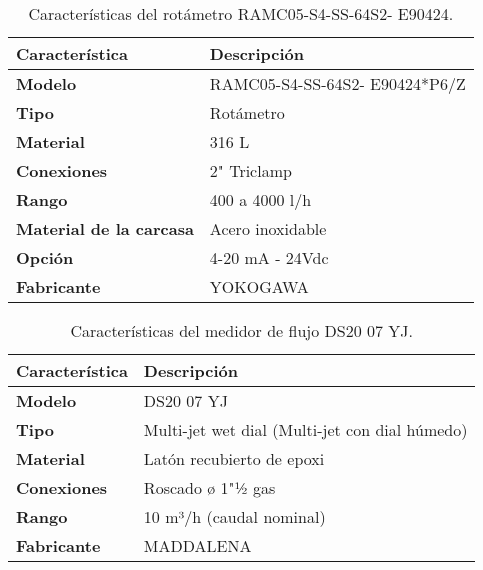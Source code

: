 \begin{table}[H]
    \centering
    \caption{Características del rotámetro RAMC05-S4-SS-64S2- E90424.}
    \label{table:sensor_transmisor_flujo}
    \begin{tabular}{| L{6cm} | L{6cm} |}
        \hline
        \textbf{Característica}         & \textbf{Descripción}           \\
        \hline
        \textbf{Modelo}                 & RAMC05-S4-SS-64S2- E90424*P6/Z \\
        \hline
        \textbf{Tipo}                   & Rotámetro                      \\
        \hline
        \textbf{Material}               & 316 L                          \\
        \hline
        \textbf{Conexiones}             & 2" Triclamp                    \\
        \hline
        \textbf{Rango}                  & 400 a 4000 l/h                 \\
        \hline
        \textbf{Material de la carcasa} & Acero inoxidable               \\
        \hline
        \textbf{Opción}                 & 4-20 mA - 24Vdc                \\
        \hline
        \textbf{Fabricante}             & YOKOGAWA                       \\
        \hline
    \end{tabular}
\end{table}



\begin{table}[H]
    \centering
    \caption{Características del medidor de flujo DS20 07 YJ.}
    \label{table:sensor_transmisor_flujo2}
    \begin{tabular}{| L{6cm} | L{6cm} |}
        \hline
        \textbf{Característica} & \textbf{Descripción}                           \\
        \hline
        \textbf{Modelo}         & DS20 07 YJ                                     \\
        \hline
        \textbf{Tipo}           & Multi-jet wet dial (Multi-jet con dial húmedo) \\
        \hline
        \textbf{Material}       & Latón recubierto de epoxi                      \\
        \hline
        \textbf{Conexiones}     & Roscado ø 1"½ gas                              \\
        \hline
        \textbf{Rango}          & 10 m³/h (caudal nominal)                       \\
        \hline
        \textbf{Fabricante}     & MADDALENA                                      \\
        \hline
    \end{tabular}
\end{table}

